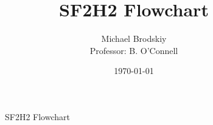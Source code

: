 


\title{SF2H2 Flowchart}
\date{\today}
\author{Michael Brodskiy\\ \small Professor: B. O'Connell}



\maketitle

\begin{figure}[H]
  \centering
  
  \caption{SF2H2 Flowchart}
  \label{fig:1}
\end{figure}



